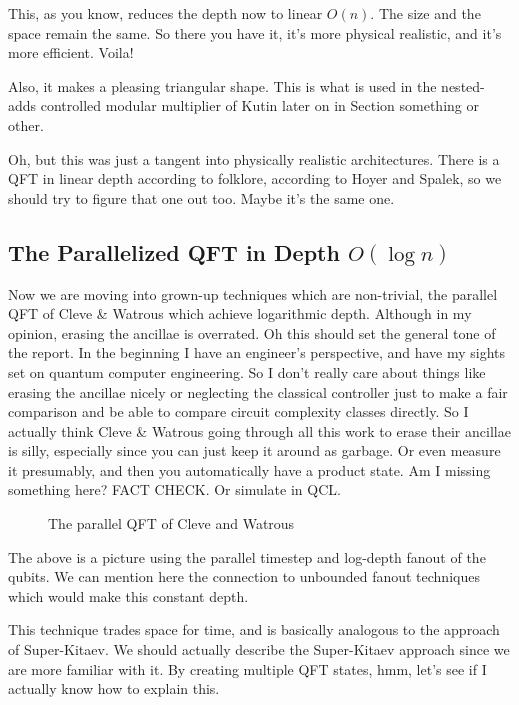 This, as you know, reduces the depth now to linear $O(n)$. The size and
the space remain the same. So there you have it, it's more physical
realistic, and it's more efficient. Voila!

Also, it makes a pleasing triangular shape. This is what is used in the
nested-adds controlled modular multiplier of Kutin later on in Section
something or other.

Oh, but this was just a tangent into physically realistic architectures.
There is a QFT in linear depth according to folklore, according to Hoyer
and Spalek, so we should try to figure that one out too. Maybe it's the same
one.

\subsection{The Parallelized QFT in Depth $O(\log n)$}

Now we are moving into grown-up techniques which are non-trivial, the
parallel QFT of Cleve \& Watrous which achieve logarithmic depth. Although in
my opinion, erasing the ancillae is overrated. Oh this should set the general
tone of the report. In the beginning I have an engineer's perspective, and
have my sights set on quantum computer engineering. So I don't really care
about things like erasing the ancillae nicely or neglecting the classical
controller just to make a fair comparison and be able to compare circuit
complexity classes directly. So I actually think Cleve \& Watrous going through
all this work to erase their ancillae is silly, especially since you can just
keep it around as garbage. Or even measure it presumably, and then you
automatically have a product state. Am I missing something here? FACT CHECK.
Or simulate in QCL.

\begin{figure}
\label{fig:qft-cw}
\caption{The parallel QFT of Cleve and Watrous}
\end{figure}

The above is a picture using the parallel timestep and log-depth fanout of
the qubits. We can mention here the connection to unbounded fanout techniques which
would make this constant depth.

This technique trades space for time, and is basically analogous to the
approach of Super-Kitaev. We should actually describe the Super-Kitaev
approach since we are more familiar with it. By creating multiple QFT states,
hmm, let's see if I actually know how to explain this.

